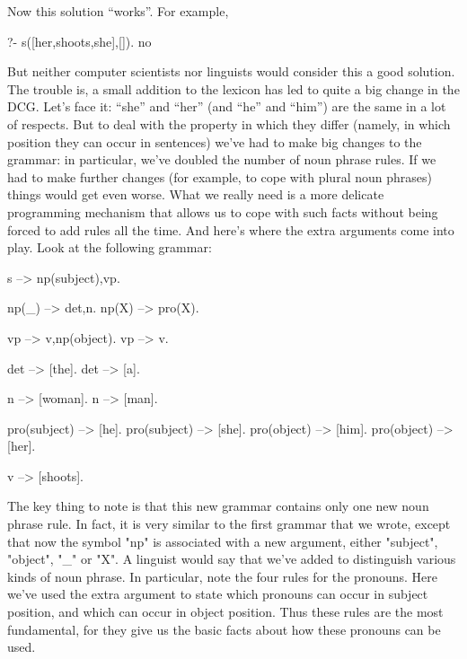 Now this solution ``works''. For example,
\begin{LPNcodedisplay}
?- s([her,shoots,she],[]).
no
\end{LPNcodedisplay}

But neither computer scientists nor linguists would consider this a
good solution.  The trouble is, a small addition to the lexicon has
led to quite a big change in the DCG. Let's face it: ``she'' and
``her'' (and ``he'' and ``him'') are the same in a lot of respects.
But to deal with the property in which they differ (namely, in which
position they can occur in sentences) we've had to make big changes to
the grammar: in particular, we've doubled the number of noun phrase
rules.  If we had to make further changes (for example, to cope with
plural noun phrases) things would get even worse.  What we really need
is a more delicate programming mechanism that allows us to cope with
such facts without being forced to add rules all the time.  And here's
where the extra arguments come into play.  Look at the following
grammar:

\begin{LPNcodedisplay}
s --> np(subject),vp.

np(_) --> det,n.
np(X) --> pro(X).

vp --> v,np(object).
vp --> v.

det --> [the].
det --> [a].

n --> [woman].
n --> [man].

pro(subject) --> [he].
pro(subject) --> [she].
pro(object) --> [him].
pro(object) --> [her].

v --> [shoots].
\end{LPNcodedisplay}




The key thing to note is that this new grammar contains only one new
noun phrase rule.  In fact, it is very similar to the first grammar
that we wrote, except that now the symbol "np" is associated with a
new argument, either "subject", "object", "_" or "X".  A
linguist would say that we've added  to distinguish
various kinds of noun phrase.  In particular, note the four rules for
the pronouns. Here we've used the extra argument to state which
pronouns can occur in subject position, and which can occur in object
position. Thus these rules are the most fundamental, for they give us
the basic facts about how these pronouns can be used.

